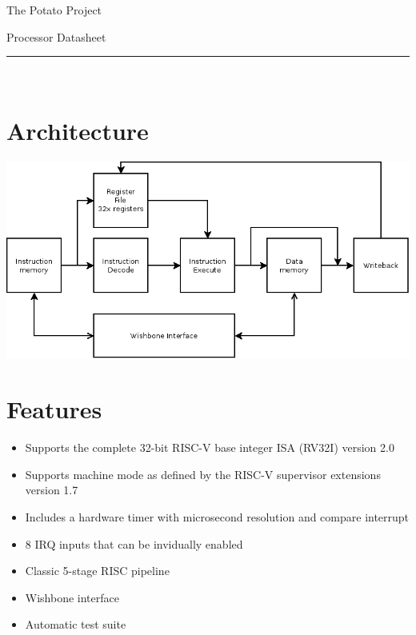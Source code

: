 \documentclass[10pt,a4paper]{article}
\begin{document}
\begin{minipage}{0.5\textwidth}
\raggedright\huge
\textsf{The Potato Project}
\end{minipage}
\begin{minipage}{0.5\textwidth}
\raggedleft\huge
\textsf{Processor Datasheet}
\end{minipage}

\vspace{0.5em}
\noindent\rule{\linewidth}{1pt}\\

\begin{minipage}[t]{0.48\textwidth}

\section{Architecture}
\includegraphics[width=\textwidth]{diagram.png}

\section{Features}

\begin{itemize}
\item Supports the complete 32-bit RISC-V base integer ISA (RV32I) version 2.0
\item Supports machine mode as defined by the RISC-V supervisor extensions version 1.7
\item Includes a hardware timer with microsecond resolution and compare interrupt
\item 8 IRQ inputs that can be invidually enabled
\item Classic 5-stage RISC pipeline
\item Wishbone interface
\item Automatic test suite
\end{itemize}


\end{minipage}
\end{document}
